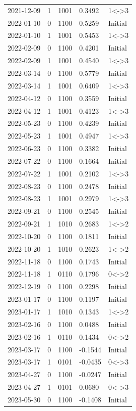 {\begin{longtable}{lllll}
2021-12-09 & 1 & 1001 & 0.3492 & 1<->3 \\
2022-01-10 & 0 & 1100 & 0.5259 & Initial \\
2022-01-10 & 1 & 1001 & 0.5453 & 1<->3 \\
2022-02-09 & 0 & 1100 & 0.4201 & Initial \\
2022-02-09 & 1 & 1001 & 0.4540 & 1<->3 \\
2022-03-14 & 0 & 1100 & 0.5779 & Initial \\
2022-03-14 & 1 & 1001 & 0.6409 & 1<->3 \\
2022-04-12 & 0 & 1100 & 0.3559 & Initial \\
2022-04-12 & 1 & 1001 & 0.4123 & 1<->3 \\
2022-05-23 & 0 & 1100 & 0.4239 & Initial \\
2022-05-23 & 1 & 1001 & 0.4947 & 1<->3 \\
2022-06-23 & 0 & 1100 & 0.3382 & Initial \\
2022-07-22 & 0 & 1100 & 0.1664 & Initial \\
2022-07-22 & 1 & 1001 & 0.2102 & 1<->3 \\
2022-08-23 & 0 & 1100 & 0.2478 & Initial \\
2022-08-23 & 1 & 1001 & 0.2979 & 1<->3 \\
2022-09-21 & 0 & 1100 & 0.2545 & Initial \\
2022-09-21 & 1 & 1010 & 0.2683 & 1<->2 \\
2022-10-20 & 0 & 1100 & 0.1811 & Initial \\
2022-10-20 & 1 & 1010 & 0.2623 & 1<->2 \\
2022-11-18 & 0 & 1100 & 0.1743 & Initial \\
2022-11-18 & 1 & 0110 & 0.1796 & 0<->2 \\
2022-12-19 & 0 & 1100 & 0.2298 & Initial \\
2023-01-17 & 0 & 1100 & 0.1197 & Initial \\
2023-01-17 & 1 & 1010 & 0.1343 & 1<->2 \\
2023-02-16 & 0 & 1100 & 0.0488 & Initial \\
2023-02-16 & 1 & 0110 & 0.1434 & 0<->2 \\
2023-03-17 & 0 & 1100 & -0.1544 & Initial \\
2023-03-17 & 1 & 0101 & -0.0435 & 0<->3 \\
2023-04-27 & 0 & 1100 & -0.0247 & Initial \\
2023-04-27 & 1 & 0101 & 0.0680 & 0<->3 \\
2023-05-30 & 0 & 1100 & -0.1408 & Initial \\

\end{longtable}}
